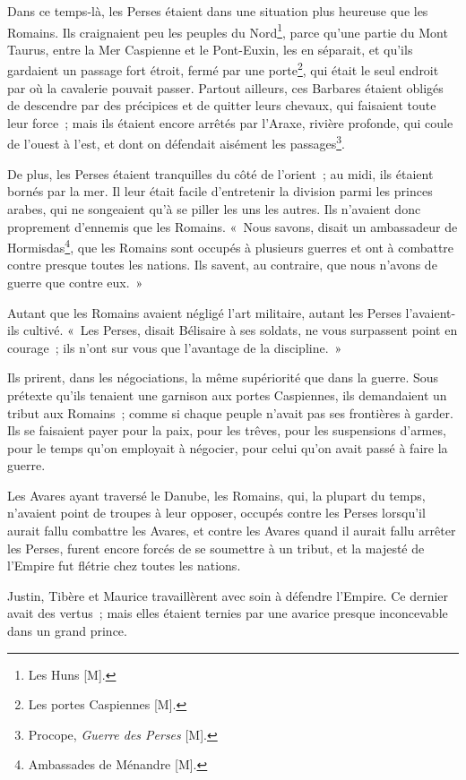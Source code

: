 \documentclass[french,twoside]{book} %
\newcommand\chaptercont{} %
\begin{document}
\chaptercont
\noindent Dans ce temps-là, les Perses étaient dans une situation plus heureuse que les Romains. Ils craignaient peu les peuples du Nord\footnote{Les Huns [M].}, parce qu’une partie du Mont Taurus, entre la Mer Caspienne et le Pont-Euxin, les en séparait, et qu’ils gardaient un passage fort étroit, fermé par une porte\footnote{Les portes Caspiennes [M].}, qui était le seul endroit par où la cavalerie pouvait passer. Partout ailleurs, ces Barbares étaient obligés de descendre par des précipices et de quitter leurs chevaux, qui faisaient toute leur force ; mais ils étaient encore arrêtés par l’Araxe, rivière profonde, qui coule de l’ouest à l’est, et dont on défendait aisément les passages\footnote{Procope, {\itshape Guerre des Perses} [M].}.\par
De plus, les Perses étaient tranquilles du côté de l’orient ; au midi, ils étaient bornés par la mer. Il leur était facile d’entretenir la division parmi les princes arabes, qui ne songeaient qu’à se piller les uns les autres. Ils n’avaient donc proprement d’ennemis que les Romains. « Nous savons, disait un ambassadeur de Hormisdas\footnote{Ambassades de Ménandre [M].}, que les Romains sont occupés à plusieurs guerres et ont à combattre contre presque toutes les nations. Ils savent, au contraire, que nous n’avons de guerre que contre eux. »\par
Autant que les Romains avaient négligé l’art militaire, autant les Perses l’avaient-ils cultivé. « Les Perses, disait Bélisaire à ses soldats, ne vous surpassent point en courage ; ils n’ont sur vous que l’avantage de la discipline. »\par
Ils prirent, dans les négociations, la même supériorité que dans la guerre. Sous prétexte qu’ils tenaient une garnison aux portes Caspiennes, ils demandaient un tribut aux Romains ; comme si chaque peuple n’avait pas ses frontières à garder. Ils se faisaient payer pour la paix, pour les trêves, pour les suspensions d’armes, pour le temps qu’on employait à négocier, pour celui qu’on avait passé à faire la guerre.\par
Les Avares ayant traversé le Danube, les Romains, qui, la plupart du temps, n’avaient point de troupes à leur opposer, occupés contre les Perses lorsqu’il aurait fallu combattre les Avares, et contre les Avares quand il aurait fallu arrêter les Perses, furent encore forcés de se soumettre à un tribut, et la majesté de l’Empire fut flétrie chez toutes les nations.\par
Justin, Tibère et Maurice travaillèrent avec soin à défendre l’Empire. Ce dernier avait des vertus ; mais elles étaient ternies par une avarice presque inconcevable dans un grand prince.\par
\end{document}
